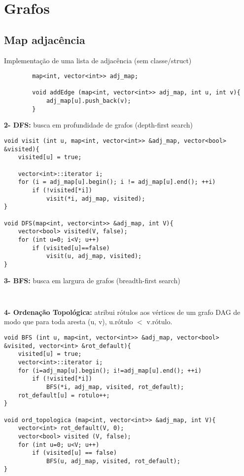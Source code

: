 \section{Grafos}

\subsection{\textbf{Map adjacência}} Implementação de uma lista de adjacência (sem classe/struct)
    \begin{verbatim}
        map<int, vector<int>> adj_map;

        void addEdge (map<int, vector<int>> adj_map, int u, int v){
            adj_map[u].push_back(v);
        }
    \end{verbatim}

\textbf{2- DFS:} busca em profundidade de grafos (depth-first search)
    \begin{verbatim}
void visit (int u, map<int, vector<int>> &adj_map, vector<bool> &visited){
    visited[u] = true;
        
    vector<int>::iterator i;
    for (i = adj_map[u].begin(); i != adj_map[u].end(); ++i)
        if (!visited[*i])
            visit(*i, adj_map, visited);
}
    
void DFS(map<int, vector<int>> &adj_map, int V){
    vector<bool> visited(V, false);
    for (int u=0; i<V; u++)
        if (visited[u]==false)
            visit(u, adj_map, visited);
}
    \end{verbatim}

\textbf{3- BFS:} busca em largura de grafos (breadth-first search)
    \begin{verbatim}
    
    \end{verbatim}

\textbf{4- Ordenação Topológica:} atribui rótulos aos vértices de um grafo DAG de modo que para toda aresta (u, v), u.rótulo $<$ v.rótulo.
    \begin{verbatim}
void BFS (int u, map<int, vector<int>> &adj_map, vector<bool> &visited, vector<int> &rot_default){
    visited[u] = true;
    vector<int>::iterator i;
    for (i=adj_map[u].begin(); i!=adj_map[u].end(); ++i)
        if (!visited[*i])
            BFS(*i, adj_map, visited, rot_default);
    rot_default[u] = rotulo++;
}

void ord_topologica (map<int, vector<int>> &adj_map, int V){
    vector<int> rot_default(V, 0);
    vector<bool> visited (V, false);
    for (int u=0; u<V; u++)
        if (visited[u] == false)
            BFS(u, adj_map, visited, rot_default);
}
    \end{verbatim}

